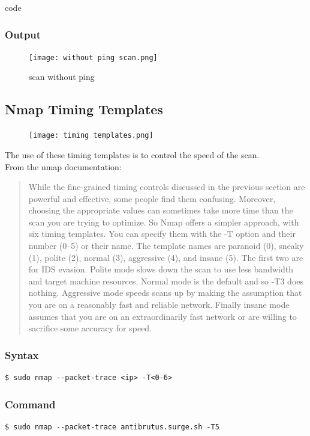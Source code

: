 code \documentclass[11pt]{article}
\begin{document}
\subsubsection*{Output}
\begin{figure}[H]
    \centering
    \texttt{[image: without ping scan.png]}
    \caption{scan without ping}
    \label{fig:1}
\end{figure}


\subsection{Nmap Timing Templates}

\begin{figure}[H]
    \centering
    \texttt{[image: timing templates.png]}
    \caption{}
\end{figure}

The use of these timing templates is to control the speed of the scan.\\
From the nmap documentation:

\begin{quotation}
    While the fine-grained timing controls discussed in the previous section are powerful and effective, some people find them confusing. Moreover, choosing the appropriate values can sometimes take more time than the scan you are trying to optimize. So Nmap offers a simpler approach, with six timing templates. You can specify them with the -T option and their number (0–5) or their name. The template names are paranoid (0), sneaky (1), polite (2), normal (3), aggressive (4), and insane (5). The first two are for IDS evasion. Polite mode slows down the scan to use less bandwidth and target machine resources. Normal mode is the default and so -T3 does nothing. Aggressive mode speeds scans up by making the assumption that you are on a reasonably fast and reliable network. Finally insane mode assumes that you are on an extraordinarily fast network or are willing to sacrifice some accuracy for speed.
\end{quotation}
    

\subsubsection{Syntax}
\begin{verbatim}
$ sudo nmap --packet-trace <ip> -T<0-6>
\end{verbatim}

\subsubsection*{Command}
\begin{verbatim}
$ sudo nmap --packet-trace antibrutus.surge.sh -T5
\end{verbatim}
\end{document}
